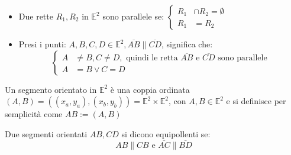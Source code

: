 \documentclass[a4paper,12pt]{article}
\begin{document}
	\begin{center}
	\end{center}
	
	\begin{itemize}
		\item Due rette $R_1, R_2$ in $\mathbb{E}^2$ sono parallele se:
		$\left\{\begin{aligned}
			R_1 & \cap R_2 = \emptyset \\
			R_1 & = R_2
		\end{aligned}\right.$
		
		\item Presi i punti: $A,B,C,D \in \mathbb{E}^2, \overline{AB} \parallel \overline{CD}$, significa che:
		\[
		\left\{\begin{aligned}
			A &\not = B, C \not = D, \text{ quindi le retta $\overline{AB}$ e $\overline{CD}$ sono parallele}\\
			A & = B \vee C = D
		\end{aligned}\right.
		\]
	\end{itemize}
	Un segmento orientato in $\mathbb{E}^2$ è una coppia ordinata $(A, B) = ((x_a, y_a), (x_b, y_b)) = \mathbb{E}^2 \times \mathbb{E}^2$, con $A, B \in \mathbb{E}^2$ e si definisce per semplicità come $AB := (A, B)$
	
	Due segmenti orientati $AB, CD$ si dicono equipollenti se:
	\[AB \parallel CB \text{ e } \overline{AC} \parallel \overline{BD}\]
	
\end{document}
